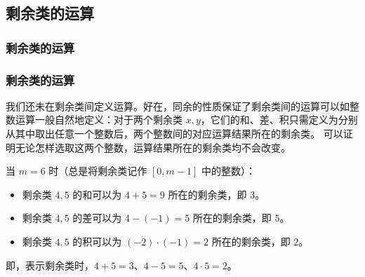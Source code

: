 \documentclass{../pkslide}
\begin{document}
\subsection{剩余类的运算}
\subsubsection{剩余类的运算}

\begin{frame}
  \frametitle{剩余类的运算}
  我们还未在剩余类间定义运算。好在，同余的性质保证了剩余类间的运算可以如整数运算一般自然地定义：对于两个剩余类 $x, y$，它们的和、差、积只需定义为分别从其中取出任意一个整数后，两个整数间的对应运算结果所在的剩余类。
    \pause
  可以证明无论怎样选取这两个整数，运算结果所在的剩余类均不会改变。
  
  \pause
  \begin{example}[剩余类的运算]
    当 $m = 6$ 时（总是将剩余类记作 $[0, m - 1]$ 中的整数）：
    
    \pause
    \begin{itemize}
      \item 剩余类 $4, 5$ 的和可以为 $4 + 5 = 9$ 所在的剩余类，即 $3$。
        \pause
      \item 剩余类 $4, 5$ 的差可以为 $4 - (-1) = 5$ 所在的剩余类，即 $5$。
        \pause
      \item 剩余类 $4, 5$ 的积可以为 $(-2) \cdot (-1) = 2$ 所在的剩余类，即 $2$。
    \end{itemize}
    
    \pause
    即，表示剩余类时，$4 + 5 = 3$、$4 - 5 = 5$、$4 \cdot 5 = 2$。
  \end{example}
\end{frame}
\end{document}

